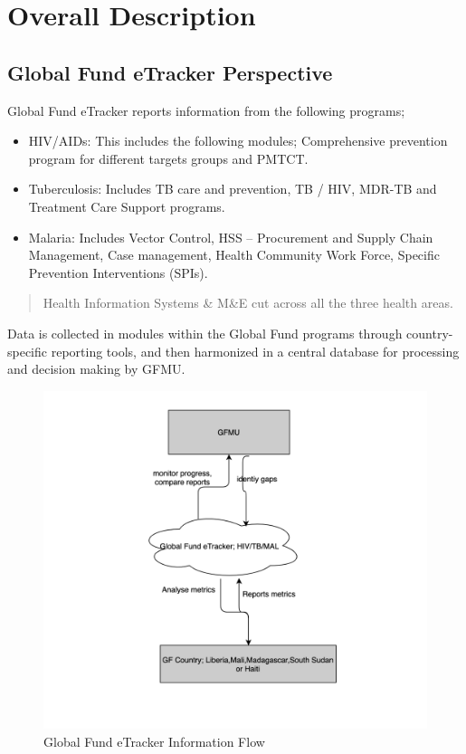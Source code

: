 \documentclass[]{book}
\providecommand{\tightlist}{%
  \setlength{\itemsep}{0pt}\setlength{\parskip}{0pt}}
\begin{document}
\hypertarget{intro}{%
\chapter{Overall Description}\label{intro}}

\hypertarget{global-fund-etracker-perspective}{%
\section{Global Fund eTracker Perspective}\label{global-fund-etracker-perspective}}

Global Fund eTracker reports information from the following programs;

\begin{itemize}
\tightlist
\item
  HIV/AIDs: This includes the following modules; Comprehensive prevention program for different targets groups and PMTCT.
\item
  Tuberculosis: Includes TB care and prevention, TB / HIV, MDR-TB and Treatment Care Support programs.
\item
  Malaria: Includes Vector Control, HSS -- Procurement and Supply Chain Management, Case management, Health Community Work Force, Specific Prevention Interventions (SPIs).
\end{itemize}

\begin{quote}
Health Information Systems \& M\&E cut across all the three health areas.
\end{quote}

Data is collected in modules within the Global Fund programs through country-specific reporting tools, and then harmonized in a central database for processing and decision making by GFMU.

\begin{figure}

{\centering \includegraphics[width=0.8\linewidth]{./images/Screenshot 2019-09-17 at 20.03.42} 

}

\caption{Global Fund eTracker Information Flow}\label{fig:nice-fig}
\end{figure}
\end{document}

